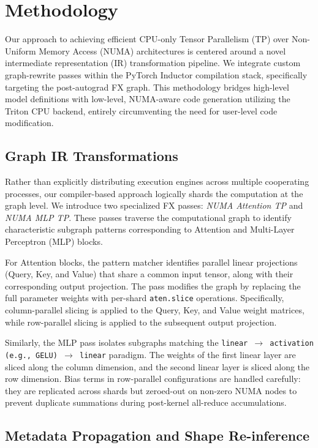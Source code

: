 \section{Methodology}
\label{sec:methodology}

Our approach to achieving efficient CPU-only Tensor Parallelism (TP) over Non-Uniform Memory Access (NUMA) architectures is centered around a novel intermediate representation (IR) transformation pipeline. We integrate custom graph-rewrite passes within the PyTorch Inductor compilation stack, specifically targeting the post-autograd FX graph. This methodology bridges high-level model definitions with low-level, NUMA-aware code generation utilizing the Triton CPU backend, entirely circumventing the need for user-level code modification.

\subsection{Graph IR Transformations}

Rather than explicitly distributing execution engines across multiple cooperating processes, our compiler-based approach logically shards the computation at the graph level. We introduce two specialized FX passes: \textit{NUMA Attention TP} and \textit{NUMA MLP TP}. These passes traverse the computational graph to identify characteristic subgraph patterns corresponding to Attention and Multi-Layer Perceptron (MLP) blocks. 

For Attention blocks, the pattern matcher identifies parallel linear projections (Query, Key, and Value) that share a common input tensor, along with their corresponding output projection. The pass modifies the graph by replacing the full parameter weights with per-shard \texttt{aten.slice} operations. Specifically, column-parallel slicing is applied to the Query, Key, and Value weight matrices, while row-parallel slicing is applied to the subsequent output projection. 

Similarly, the MLP pass isolates subgraphs matching the \texttt{linear $\rightarrow$ activation (e.g., GELU) $\rightarrow$ linear} paradigm. The weights of the first linear layer are sliced along the column dimension, and the second linear layer is sliced along the row dimension. Bias terms in row-parallel configurations are handled carefully: they are replicated across shards but zeroed-out on non-zero NUMA nodes to prevent duplicate summations during post-kernel all-reduce accumulations.

\subsection{Metadata Propagation and Shape Re-inference}

